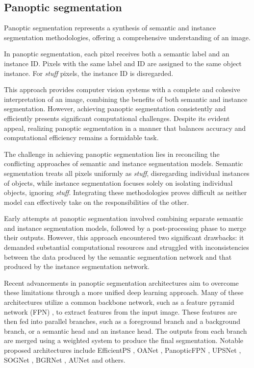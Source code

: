   \subsection{Panoptic segmentation}
Panoptic segmentation represents a synthesis of semantic and instance segmentation methodologies, offering a comprehensive understanding of an image.

In panoptic segmentation, each pixel receives both a semantic label and an instance ID. Pixels with the same label and ID are assigned to the same object instance. For \textit{stuff} pixels, the instance ID is disregarded.

This approach provides computer vision systems with a complete and cohesive interpretation of an image, combining the benefits of both semantic and instance segmentation. However, achieving panoptic segmentation consistently and efficiently presents significant computational challenges. Despite its evident appeal, realizing panoptic segmentation in a manner that balances accuracy and computational efficiency remains a formidable task.

The challenge in achieving panoptic segmentation lies in reconciling the conflicting approaches of semantic and instance segmentation models. Semantic segmentation treats all pixels uniformly as \textit{stuff}, disregarding individual instances of objects, while instance segmentation focuses solely on isolating individual objects, ignoring \textit{stuff}. Integrating these methodologies proves difficult as neither model can effectively take on the responsibilities of the other.

Early attempts at panoptic segmentation involved combining separate semantic and instance segmentation models, followed by a post-processing phase to merge their outputs. However, this approach encountered two significant drawbacks: it demanded substantial computational resources and struggled with inconsistencies between the data produced by the semantic segmentation network and that produced by the instance segmentation network.

Recent advancements in panoptic segmentation architectures aim to overcome these limitations through a more unified deep learning approach. Many of these architectures utilize a common backbone network, such as a feature pyramid network (FPN) \cite{FPNLin2017}, to extract features from the input image. These features are then fed into parallel branches, such as a foreground branch and a background branch, or a semantic head and an instance head. The outputs from each branch are merged using a weighted system to produce the final segmentation. Notable proposed architectures include EfficientPS \cite{mohan2020efficientps}, OANet \cite{zhang2019oanet}, PanopticFPN \cite{kirillov2019panoptic}, UPSNet \cite{xiong2019upsnet}, SOGNet \cite{yang2019sognet}, BGRNet \cite{wu2020bidirectional}, AUNet \cite{sun2019aunet} and others.

